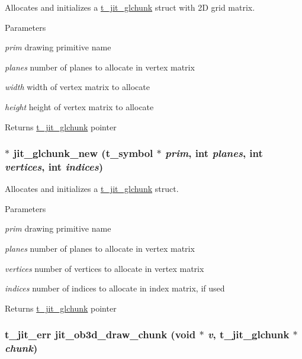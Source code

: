 Allocates and initializes a \hyperlink{structt__jit__glchunk}{t\_\-jit\_\-glchunk} struct with 2D grid matrix. 
\begin{DoxyParams}{Parameters}
\item[{\em prim}]drawing primitive name \item[{\em planes}]number of planes to allocate in vertex matrix \item[{\em width}]width of vertex matrix to allocate \item[{\em height}]height of vertex matrix to allocate\end{DoxyParams}
\begin{DoxyReturn}{Returns}
\hyperlink{structt__jit__glchunk}{t\_\-jit\_\-glchunk} pointer 
\end{DoxyReturn}
\hypertarget{group__ob3dmod_gae1cfab3f91302b90cdcd8e8723295f91}{
\subsubsection[{jit\_\-glchunk\_\-new}]{$\ast$ jit\_\-glchunk\_\-new ({\bf t\_\-symbol} $\ast$ {\em prim}, \/  int {\em planes}, \/  int {\em vertices}, \/  int {\em indices})}}
\label{group__ob3dmod_gae1cfab3f91302b90cdcd8e8723295f91}


Allocates and initializes a \hyperlink{structt__jit__glchunk}{t\_\-jit\_\-glchunk} struct. 
\begin{DoxyParams}{Parameters}
\item[{\em prim}]drawing primitive name \item[{\em planes}]number of planes to allocate in vertex matrix \item[{\em vertices}]number of vertices to allocate in vertex matrix \item[{\em indices}]number of indices to allocate in index matrix, if used\end{DoxyParams}
\begin{DoxyReturn}{Returns}
\hyperlink{structt__jit__glchunk}{t\_\-jit\_\-glchunk} pointer 
\end{DoxyReturn}
\hypertarget{group__ob3dmod_gacb2a2ba1b2bb33377aa10b45bb3a0531}{
\subsubsection[{jit\_\-ob3d\_\-draw\_\-chunk}]{\setlength{\rightskip}{0pt plus 5cm}t\_\-jit\_\-err jit\_\-ob3d\_\-draw\_\-chunk (void $\ast$ {\em v}, \/  {\bf t\_\-jit\_\-glchunk} $\ast$ {\em chunk})}}
\label{group__ob3dmod_gacb2a2ba1b2bb33377aa10b45bb3a0531}



